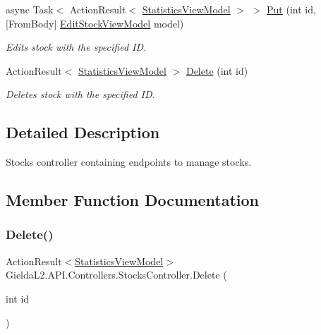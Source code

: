 \begin{DoxyCompactItemize}
async Task$<$ Action\+Result$<$ \mbox{\hyperlink{class_gielda_l2_1_1_a_p_i_1_1_view_models_1_1_view_1_1_statistics_view_model}{Statistics\+View\+Model}} $>$ $>$ \mbox{\hyperlink{class_gielda_l2_1_1_a_p_i_1_1_controllers_1_1_stocks_controller_a1bd303fea5e96889618d79668344f6ad}{Put}} (int id, \mbox{[}From\+Body\mbox{]} \mbox{\hyperlink{class_gielda_l2_1_1_a_p_i_1_1_view_models_1_1_edit_1_1_edit_stock_view_model}{Edit\+Stock\+View\+Model}} model)
\begin{DoxyCompactList}\small\item\em Edits stock with the specified ID. \end{DoxyCompactList}\item 
Action\+Result$<$ \mbox{\hyperlink{class_gielda_l2_1_1_a_p_i_1_1_view_models_1_1_view_1_1_statistics_view_model}{Statistics\+View\+Model}} $>$ \mbox{\hyperlink{class_gielda_l2_1_1_a_p_i_1_1_controllers_1_1_stocks_controller_ad83a73170f0d55d1b08353e76adef581}{Delete}} (int id)
\begin{DoxyCompactList}\small\item\em Deletes stock with the specified ID. \end{DoxyCompactList}\end{DoxyCompactItemize}


\subsection{Detailed Description}
Stocks controller containing endpoints to manage stocks. 



\subsection{Member Function Documentation}
\mbox{\label{class_gielda_l2_1_1_a_p_i_1_1_controllers_1_1_stocks_controller_ad83a73170f0d55d1b08353e76adef581}} 
\subsubsection{\texorpdfstring{Delete()}{Delete()}}
{\footnotesize\ttfamily Action\+Result$<$\mbox{\hyperlink{class_gielda_l2_1_1_a_p_i_1_1_view_models_1_1_view_1_1_statistics_view_model}{Statistics\+View\+Model}}$>$ Gielda\+L2.\+A\+P\+I.\+Controllers.\+Stocks\+Controller.\+Delete (\begin{DoxyParamCaption}\item[{int}]{id }\end{DoxyParamCaption})}



